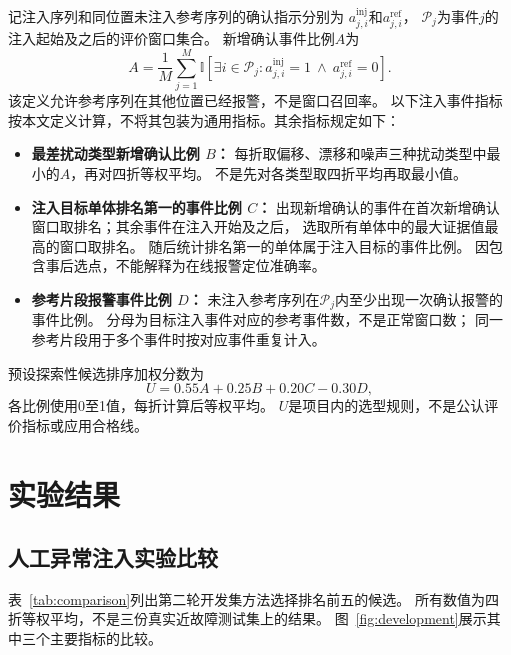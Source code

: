 \documentclass[UTF8,a4paper,12pt,fontset=fandol]{ctexart}
\begin{document}
记注入序列和同位置未注入参考序列的确认指示分别为
$a^{\mathrm{inj}}_{j,i}$和$a^{\mathrm{ref}}_{j,i}$，
$\mathcal{P}_j$为事件$j$的注入起始及之后的评价窗口集合。
新增确认事件比例$A$为
\begin{equation}
  A=\frac{1}{M}\sum_{j=1}^{M}
  \mathbb{I}\!\left[
    \exists i\in\mathcal{P}_j:
    a^{\mathrm{inj}}_{j,i}=1\ \land\ a^{\mathrm{ref}}_{j,i}=0
  \right].
  \label{eq:metric-a}
\end{equation}
该定义允许参考序列在其他位置已经报警，不是窗口召回率。
以下注入事件指标按本文定义计算，不将其包装为通用指标。其余指标规定如下：
\begin{itemize}
  \item \textbf{最差扰动类型新增确认比例 $B$：}
  每折取偏移、漂移和噪声三种扰动类型中最小的$A$，再对四折等权平均。
  不是先对各类型取四折平均再取最小值。
  \item \textbf{注入目标单体排名第一的事件比例 $C$：}
  出现新增确认的事件在首次新增确认窗口取排名；其余事件在注入开始及之后，
  选取所有单体中的最大证据值最高的窗口取排名。
  随后统计排名第一的单体属于注入目标的事件比例。
  因包含事后选点，不能解释为在线报警定位准确率。
  \item \textbf{参考片段报警事件比例 $D$：}
  未注入参考序列在$\mathcal{P}_j$内至少出现一次确认报警的事件比例。
  分母为目标注入事件对应的参考事件数，不是正常窗口数；
  同一参考片段用于多个事件时按对应事件重复计入。
\end{itemize}

预设探索性候选排序加权分数为
\begin{equation}
  U=0.55A+0.25B+0.20C-0.30D,
  \label{eq:utility}
\end{equation}
各比例使用0至1值，每折计算后等权平均。
$U$是项目内的选型规则，不是公认评价指标或应用合格线。

\section{实验结果}

\subsection{人工异常注入实验比较}

表~\ref{tab:comparison}列出第二轮开发集方法选择排名前五的候选。
所有数值为四折等权平均，不是三份真实近故障测试集上的结果。
图~\ref{fig:development}展示其中三个主要指标的比较。
\end{document}
